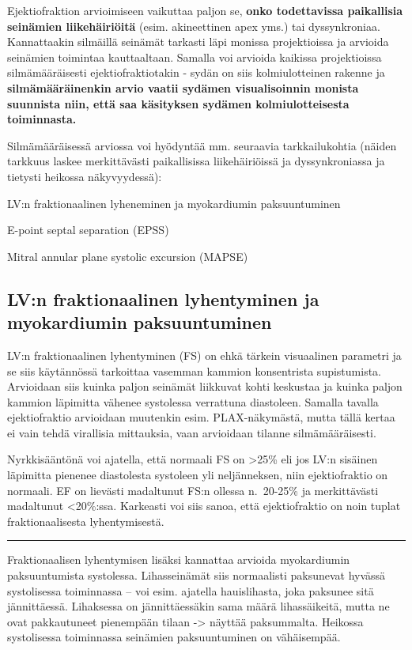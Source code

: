 \documentclass[
]{book}
\begin{document}
Ejektiofraktion arvioimiseen vaikuttaa paljon se, \textbf{onko todettavissa paikallisia seinämien liikehäiriöitä} (esim. akineettinen apex yms.) tai dyssynkroniaa. Kannattaakin silmäillä seinämät tarkasti läpi monissa projektioissa ja arvioida seinämien toimintaa kauttaaltaan. Samalla voi arvioida kaikissa projektioissa silmämääräisesti ejektiofraktiotakin - sydän on siis kolmiulotteinen rakenne ja \textbf{silmämääräinenkin arvio vaatii sydämen visualisoinnin monista suunnista niin, että saa käsityksen sydämen kolmiulotteisesta toiminnasta.}

Silmämääräisessä arviossa voi hyödyntää mm. seuraavia tarkkailukohtia (näiden tarkkuus laskee merkittävästi paikallisissa liikehäiriöissä ja dyssynkroniassa ja tietysti heikossa näkyvyydessä):

LV:n fraktionaalinen lyheneminen ja myokardiumin paksuuntuminen

E-point septal separation (EPSS)

Mitral annular plane systolic excursion (MAPSE)

\subsection{LV:n fraktionaalinen lyhentyminen ja myokardiumin paksuuntuminen}\label{lvn-fraktionaalinen-lyhentyminen-ja-myokardiumin-paksuuntuminen}

LV:n fraktionaalinen lyhentyminen (FS) on ehkä tärkein visuaalinen parametri ja se siis käytännössä tarkoittaa vasemman kammion konsentrista supistumista. Arvioidaan siis kuinka paljon seinämät liikkuvat kohti keskustaa ja kuinka paljon kammion läpimitta vähenee systolessa verrattuna diastoleen. Samalla tavalla ejektiofraktio arvioidaan muutenkin esim. PLAX-näkymästä, mutta tällä kertaa ei vain tehdä virallisia mittauksia, vaan arvioidaan tilanne silmämääräisesti.

Nyrkkisääntönä voi ajatella, että normaali FS on \textgreater25\% eli jos LV:n sisäinen läpimitta pienenee diastolesta systoleen yli neljänneksen, niin ejektiofraktio on normaali. EF on lievästi madaltunut FS:n ollessa n.~20-25\% ja merkittävästi madaltunut \textless20\%:ssa. Karkeasti voi siis sanoa, että ejektiofraktio on noin tuplat fraktionaalisesta lyhentymisestä.

\begin{center}\rule{0.5\linewidth}{0.5pt}\end{center}

Fraktionaalisen lyhentymisen lisäksi kannattaa arvioida myokardiumin paksuuntumista systolessa. Lihasseinämät siis normaalisti paksunevat hyvässä systolisessa toiminnassa -- voi esim. ajatella hauislihasta, joka paksunee sitä jännittäessä. Lihaksessa on jännittäessäkin sama määrä lihassäikeitä, mutta ne ovat pakkautuneet pienempään tilaan -\textgreater{} näyttää paksummalta. Heikossa systolisessa toiminnassa seinämien paksuuntuminen on vähäisempää.
\end{document}
